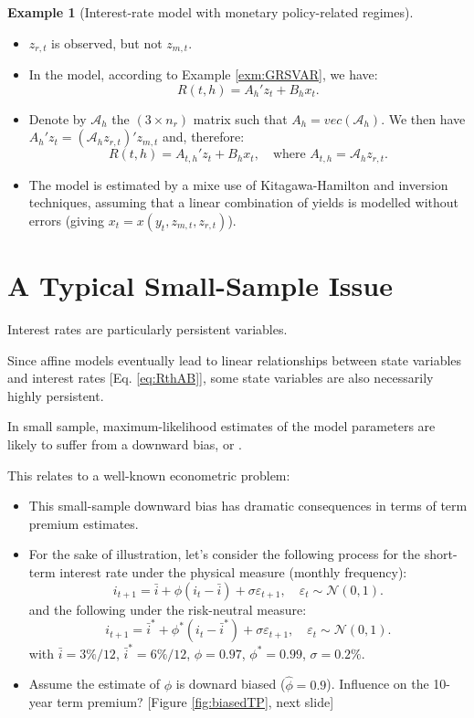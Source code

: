 \documentclass[
  12pt,
]{book}
\providecommand{\tightlist}{%
  \setlength{\itemsep}{0pt}\setlength{\parskip}{0pt}}
\theoremstyle{definition}
\theoremstyle{definition}
\newtheorem{example}{Example}[chapter]
\theoremstyle{definition}
\theoremstyle{definition}
\theoremstyle{remark}
\begin{document}
\begin{example}[Interest-rate model with monetary policy-related regimes]
\begin{itemize}
\tightlist
\item
  \(z_{r,t}\) is observed, but not \(z_{m,t}\).
\item
  In the model, according to Example \ref{exm:GRSVAR}, we have:
  \[
  R(t,h) = A_h' z_t + B_h x_t.
  \]
\item
  Denote by \(\mathcal{A}_h\) the \((3 \times n_r)\) matrix such that \(A_h = vec(\mathcal{A}_h)\). We then have \(A_h' z_t = (\mathcal{A}_h z_{r,t})' z_{m,t}\) and, therefore:
  \[
  R(t,h) = A_{t,h}' z_t + B_h x_t, \quad \mbox{where $A_{t,h} = \mathcal{A}_h z_{r,t}$.}
  \]
\item
  The model is estimated by a mixe use of Kitagawa-Hamilton and inversion techniques, assuming that a linear combination of yields is modelled without errors (giving \(x_t = x(y_t,z_{m,t},z_{r,t})\)).
\end{itemize}

\end{example}

\hypertarget{EstimationPersistency}{%
\section{A Typical Small-Sample Issue}\label{EstimationPersistency}}

Interest rates are particularly persistent variables.

Since affine models eventually lead to linear relationships between state variables and interest rates {[}Eq. \eqref{eq:RthAB}{]}, some state variables are also necessarily highly persistent.

In small sample, maximum-likelihood estimates of the model parameters are likely to suffer from a downward bias, \citet{Bauer_Rudebusch_Wu_2012} or \citet{Jardet_Monfort_Pegoraro_2013}.

This relates to a well-known econometric problem:

\begin{itemize}
\tightlist
\item
  This small-sample downward bias has dramatic consequences in terms of term premium estimates.
\item
  For the sake of illustration, let's consider the following process for the short-term interest rate under the physical measure (monthly frequency):
  \[
  i_{t+1} = \bar{i} + \phi (i_{t}-\bar{i}) + \sigma \varepsilon_{t+1}, \quad \varepsilon_t \sim \mathcal{N}(0,1).
  \]
  and the following under the risk-neutral measure:
  \[
  i_{t+1} = \bar{i}^* + \phi^* (i_{t}-\bar{i}^*) + \sigma \varepsilon_{t+1}, \quad \varepsilon_t \sim \mathcal{N}(0,1).
  \]
  with \(\bar{i} = 3\%/12\), \(\bar{i}^* = 6\%/12\), \(\phi = 0.97\), \(\phi^*=0.99\), \(\sigma = 0.2\%\).
\item
  Assume the estimate of \(\phi\) is downard biased (\(\hat\phi=0.9\)). Influence on the 10-year term premium? {[}Figure \ref{fig:biasedTP}, next slide{]}
\end{itemize}
\end{document}
